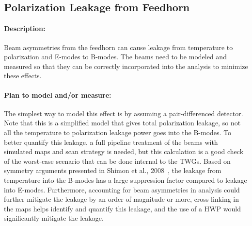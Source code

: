 \subsection{Polarization Leakage from Feedhorn}

\paragraph{Description:}

Beam asymmetries from the feedhorn can cause leakage from temperature to polarization and E-modes to B-modes. The beams need to be modeled and measured so that they can be correctly incorporated into the analysis to minimize these effects.

\paragraph{Plan to model and/or measure:}
The simplest way to model this effect is by assuming a pair-differenced detector. Note that this is a simplified model that gives total polarization leakage, so not all the temperature to polarization leakage power goes into the B-modes. To better quantify this leakage, a full pipeline treatment of the beams with simulated maps and scan strategy is needed, but this calculation is a good check of the worst-case scenario that can be done internal to the TWGs. Based on symmetry arguments presented in Shimon et al., 2008~\cite{Shimon_2008}, the leakage from temperature into the B-modes has a large suppression factor compared to leakage into E-modes. Furthermore, accounting for beam asymmetries in analysis could further mitigate the leakage by an order of magnitude or more, cross-linking in the maps helps identify and quantify this leakage, and the use of a HWP would significantly mitigate the leakage.

